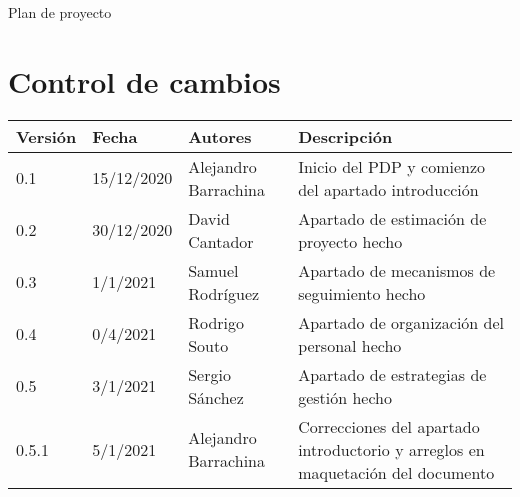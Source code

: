 \documentclass[12pt]{article}
\title{\nombredelproyecto}
\author{Alejandro Barrachina Argudo \\
David Cantador Piedras \\
Rodrigo Sosa Sáez \\
Juan Pantaleón Femenía Quevedo \\
David Llanes Martín \\
Sergio Sánchez Chamizo  \\
Samuel Rodríguez Moreno \\
Rodrigo Souto Santos
}
\date{\today}
\begin{document}
\begin{titlepage}
	\makeatletter
	{
		\centering
		\vspace*{4cm}
		{\fontsize{40pt}{40pt}\scshape\textbf{\@title}\par}


		{\Huge Plan de proyecto\par}

		\vspace*{1cm}
		{\Large\itshape
			\@author
			\par}
	}
	\vfill
	\makeatother
\end{titlepage}
\newpage

\section*{Control de cambios} %
\noindent\begin{tabularx}{\textwidth}{ |l|l|p{5cm}|X| }
	\hline
	\textbf{Versión}       & \textbf{Fecha}                                                                   & \textbf{Autores}              & \textbf{Descripción}                                                            \\
	\hline
	0.1                    & 15/12/2020                                                                       & Alejandro Barrachina          & Inicio del PDP y comienzo del apartado introducción                             \\
	\hline
	0.2                    & 30/12/2020                                                                       & David Cantador                & Apartado de estimación de proyecto hecho                                        \\
	\hline
	0.3                    & 1/1/2021                                                                         & Samuel Rodríguez              & Apartado de mecanismos de seguimiento hecho                                     \\
	\hline
	0.4                    & 0/4/2021                                                                         & Rodrigo Souto                 & Apartado de organización del personal hecho                                     \\
	\hline
	0.5                    & 3/1/2021                                                                         & Sergio Sánchez                & Apartado de estrategias de gestión hecho                                        \\
	\hline
	0.5.1                  & 5/1/2021                                                                         & Alejandro Barrachina          & Correcciones del apartado introductorio y arreglos en maquetación del documento \\

\end{tabularx}
\end{document}
